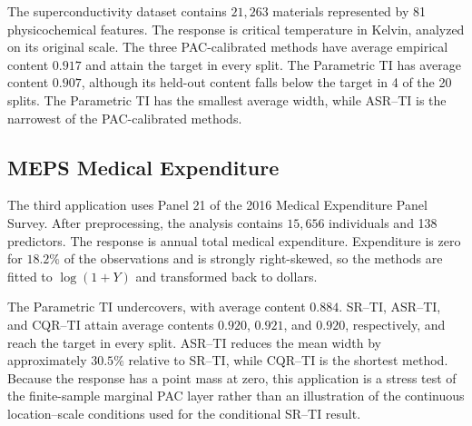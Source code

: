 The superconductivity dataset contains \(21{,}263\) materials represented by 81
physicochemical features. The response is critical temperature in Kelvin,
analyzed on its original scale. The three PAC-calibrated methods have average
empirical content \(0.917\) and attain the target in every split. The Parametric
TI has average content \(0.907\), although its held-out content falls below the
target in 4 of the 20 splits. The Parametric TI has the smallest average width,
while ASR--TI is the narrowest of the PAC-calibrated methods.

\subsection{MEPS Medical Expenditure}

The third application uses Panel 21 of the 2016 Medical Expenditure Panel Survey.
After preprocessing, the analysis contains \(15{,}656\) individuals and 138
predictors. The response is annual total medical expenditure. Expenditure is
zero for \(18.2\%\) of the observations and is strongly right-skewed, so the
methods are fitted to \(\log(1+Y)\) and transformed back to dollars.

The Parametric TI undercovers, with average content \(0.884\). SR--TI, ASR--TI,
and CQR--TI attain average contents \(0.920\), \(0.921\), and \(0.920\),
respectively, and reach the target in every split.
ASR--TI reduces the mean width by approximately \(30.5\%\) relative to SR--TI,
while CQR--TI is the shortest method. Because the response has a point mass at
zero, this application is a stress test of the finite-sample marginal PAC layer
rather than an illustration of the continuous location--scale conditions used
for the conditional SR--TI result.

